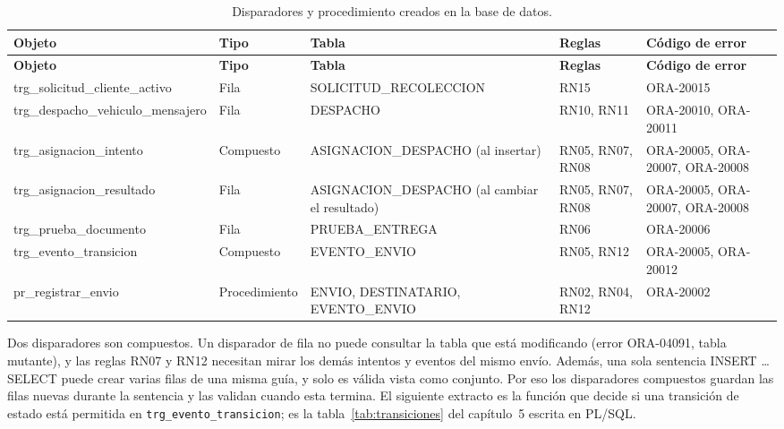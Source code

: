 {\singlespacing\small
\begin{longtable}{L{3.7cm} L{2.3cm} L{3.5cm} L{1.6cm} L{2.4cm}}
\caption{Disparadores y procedimiento creados en la base de datos.}
\label{tab:proto-objetos}\\
\toprule
\textbf{Objeto} & \textbf{Tipo} & \textbf{Tabla} & \textbf{Reglas} & \textbf{Código de error} \\
\midrule
\endfirsthead
\toprule
\textbf{Objeto} & \textbf{Tipo} & \textbf{Tabla} & \textbf{Reglas} & \textbf{Código de error} \\
\midrule
\endhead
\bottomrule
\endfoot
trg\_\allowbreak{}solicitud\_\allowbreak{}cliente\_\allowbreak{}activo & Fila & SOLICITUD\_\allowbreak{}RECOLECCION & RN15 & ORA-20015 \\
trg\_\allowbreak{}despacho\_\allowbreak{}vehiculo\_\allowbreak{}mensajero & Fila & DESPACHO & RN10, RN11 & ORA-20010, ORA-20011 \\
trg\_\allowbreak{}asignacion\_\allowbreak{}intento & Compuesto & ASIGNACION\_\allowbreak{}DESPACHO (al insertar) & RN05, RN07, RN08 & ORA-20005, ORA-20007, ORA-20008 \\
trg\_\allowbreak{}asignacion\_\allowbreak{}resultado & Fila & ASIGNACION\_\allowbreak{}DESPACHO (al cambiar el resultado) & RN05, RN07, RN08 & ORA-20005, ORA-20007, ORA-20008 \\
trg\_\allowbreak{}prueba\_\allowbreak{}documento & Fila & PRUEBA\_\allowbreak{}ENTREGA & RN06 & ORA-20006 \\
trg\_\allowbreak{}evento\_\allowbreak{}transicion & Compuesto & EVENTO\_\allowbreak{}ENVIO & RN05, RN12 & ORA-20005, ORA-20012 \\
pr\_\allowbreak{}registrar\_\allowbreak{}envio & Procedimiento & ENVIO, DESTINATARIO, EVENTO\_\allowbreak{}ENVIO & RN02, RN04, RN12 & ORA-20002 \\
\end{longtable}
\par}

Dos disparadores son compuestos. Un disparador de fila no puede
consultar la tabla que está modificando (error ORA-04091, tabla
mutante), y las reglas RN07 y RN12 necesitan mirar los demás intentos y
eventos del mismo envío. Además, una sola sentencia INSERT \ldots{}
SELECT puede crear varias filas de una misma guía, y solo es válida
vista como conjunto. Por eso los disparadores compuestos guardan las
filas nuevas durante la sentencia y las validan cuando esta termina. El
siguiente extracto es la función que decide si una transición de estado
está permitida en \texttt{trg\_evento\_transicion}; es la
tabla~\ref{tab:transiciones} del capítulo~5 escrita en PL/SQL.

